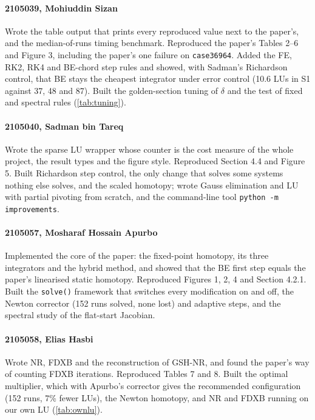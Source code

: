\documentclass[sigconf,nonacm]{acmart}
\newcommand{\code}[1]{\texttt{#1}}
\begin{document}
\paragraph{2105039, Mohiuddin Sizan}
Wrote the table output that prints every reproduced value next to the paper's, and the median-of-runs
timing benchmark. Reproduced the paper's Tables 2--6 and Figure 3, including the paper's one failure on
\code{case36964}. Added the FE, RK2, RK4 and BE-chord step rules and showed, with Sadman's Richardson
control, that BE stays the cheapest integrator under error control (10.6 LUs in S1 against 37, 48 and 87).
Built the golden-section tuning of $\delta$ and the test of fixed and spectral rules (\cref{tab:tuning}).

\paragraph{2105040, Sadman bin Tareq}
Wrote the sparse LU wrapper whose counter is the cost measure of the whole project, the result types and
the figure style. Reproduced Section 4.4 and Figure 5. Built Richardson step control, the only change that
solves some systems nothing else solves, and the scaled homotopy; wrote Gauss elimination and LU with
partial pivoting from scratch, and the command-line tool \code{python -m improvements}.

\paragraph{2105057, Mosharaf Hossain Apurbo}
Implemented the core of the paper: the fixed-point homotopy, its three integrators and the hybrid method,
and showed that the BE first step equals the paper's linearised static homotopy. Reproduced Figures 1, 2, 4
and Section 4.2.1. Built the \code{solve()} framework that switches every modification on and off, the
Newton corrector (152 runs solved, none lost) and adaptive steps, and the spectral study of the flat-start
Jacobian.

\paragraph{2105058, Elias Hasbi}
Wrote NR, FDXB and the reconstruction of GSH-NR, and found the paper's way of counting FDXB iterations.
Reproduced Tables 7 and 8. Built the optimal multiplier, which with Apurbo's corrector gives the
recommended configuration (152 runs, 7\% fewer LUs), the Newton homotopy, and NR and FDXB running on our
own LU (\cref{tab:ownlu}).
\end{document}
